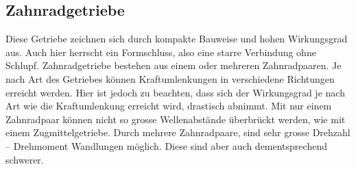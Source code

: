 \subsection{Zahnradgetriebe}
Diese Getriebe zeichnen sich durch kompakte Bauweise und hohen Wirkungsgrad aus. Auch hier herrscht ein Formschluss, also eine starre Verbindung ohne Schlupf. Zahnradgetriebe bestehen aus einem oder mehreren Zahnradpaaren. Je nach Art des Getriebes können Kraftumlenkungen in verschiedene Richtungen erreicht werden. Hier ist jedoch zu beachten, dass sich der Wirkungsgrad je nach Art wie die Kraftumlenkung erreicht wird, drastisch abnimmt. Mit nur einem Zahnradpaar können nicht so grosse Wellenabstände überbrückt werden, wie mit einem Zugmittelgetriebe. Durch mehrere Zahnradpaare, sind sehr grosse Drehzahl – Drehmoment Wandlungen möglich. Diese sind aber auch dementsprechend schwerer. 
